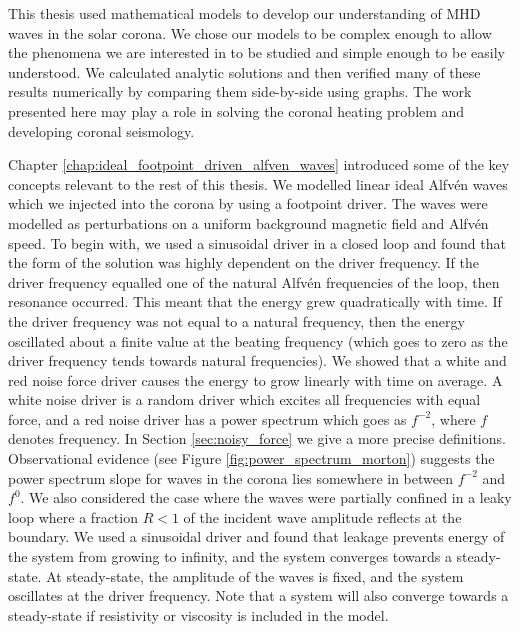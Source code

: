 This thesis used mathematical models to develop our understanding of MHD waves in the solar corona.
We chose our models to be complex enough to allow the phenomena we are interested in to be studied and simple enough to be easily understood. We calculated analytic solutions and then verified many of these results numerically by comparing them side-by-side using graphs. The work presented here may play a role in solving the coronal heating problem and developing coronal seismology. 

Chapter \ref{chap:ideal_footpoint_driven_alfven_waves} introduced some of the key concepts relevant to the rest of this thesis. We modelled linear ideal Alfv\'en waves which we injected into the corona by using a footpoint driver. The waves were modelled as perturbations on a uniform background magnetic field and Alfv\'en speed. To begin with, we used a sinusoidal driver in a closed loop and found that the form of the solution was highly dependent on the driver frequency. If the driver frequency equalled one of the natural Alfv\'en frequencies of the loop, then resonance occurred. This meant that the energy grew quadratically with time. If the driver frequency was not equal to a natural frequency, then the energy oscillated about a finite value at the beating frequency (which goes to zero as the driver frequency tends towards natural frequencies). We showed that a white and red noise force driver causes the energy to grow linearly with time on average. A white noise driver is a random driver which excites all frequencies with equal force, and a red noise driver has a power spectrum which goes as $f^{-2}$, where $f$ denotes frequency. In Section \ref{sec:noisy_force} we give a more precise definitions. Observational evidence (see Figure \ref{fig:power_spectrum_morton}) suggests the power spectrum slope for waves in the corona lies somewhere in between $f^{-2}$ and $f^0$. We also considered the case where the waves were partially confined in a leaky loop where a fraction $R<1$ of the incident wave amplitude reflects at the boundary. We used a sinusoidal driver and found that leakage prevents energy of the system from growing to infinity, and the system converges towards a steady-state. At steady-state, the amplitude of the waves is fixed, and the system oscillates at the driver frequency. Note that a system will also converge towards a steady-state if resistivity or viscosity is included in the model.

